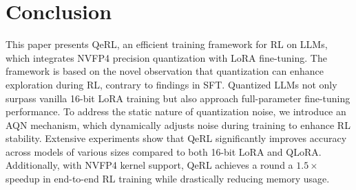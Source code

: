 \section{Conclusion}
This paper presents QeRL, an efficient training framework for RL on LLMs, which integrates NVFP4 precision quantization with LoRA fine-tuning. The framework is based on the novel observation that quantization can enhance exploration during RL, contrary to findings in SFT. Quantized LLMs not only surpass vanilla 16-bit LoRA training but also approach full-parameter fine-tuning performance. To address the static nature of quantization noise, we introduce an AQN mechanism, which dynamically adjusts noise during training to enhance RL stability. Extensive experiments show that QeRL significantly improves accuracy across models of various sizes compared to both 16-bit LoRA and QLoRA. Additionally, with NVFP4 kernel support, QeRL achieves a round a $1.5\times$ speedup in end-to-end RL training while drastically reducing memory usage.